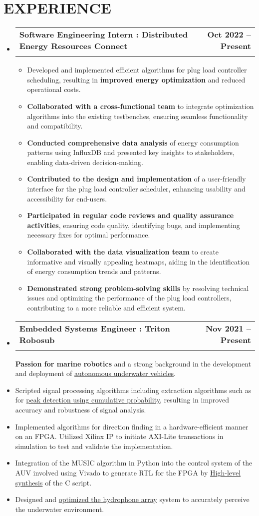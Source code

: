 \documentclass[letterpaper,11pt]{article}
\makeatletter
\newcommand{\resumeItem}[1]{
  \item\small{
    {#1 \vspace{-2pt}}
  }
}
\newcommand{\resumeSubheading}[4]{
  \vspace{-2pt}\item
    \begin{tabular*}{1.0\textwidth}[t]{l@{\extracolsep{\fill}}r}
      \textbf{\large#1} & \textbf{\small #2} \\
      \textit{\large#3} & \textit{\small #4} \\
      
    \end{tabular*}\vspace{-7pt}
}
\newcommand{\resumeSubHeadingListStart}{\begin{itemize}[leftmargin=0.0in, label={}]}
\newcommand{\resumeItemListStart}{\begin{itemize}}
\newcommand{\resumeItemListEnd}{\end{itemize}\vspace{-5pt}}
\makeatother
\begin{document}
\section{EXPERIENCE}
\vspace{5pt}
\resumeSubHeadingListStart
  \resumeSubheading
    {Software Engineering Intern : Distributed Energy Resources Connect}{Oct 2022 -- Present}
    {\underline{}}{\vspace{-15pt}}
    \resumeItemListStart
      \resumeItem{Developed and implemented efficient algorithms for plug load controller scheduling, resulting in
      \textbf{improved energy optimization} and reduced operational costs.}
      \resumeItem{\textbf{Collaborated with a cross-functional team} to integrate optimization algorithms into the existing testbenches, ensuring seamless functionality and compatibility.}
      \resumeItem{\textbf{Conducted comprehensive data analysis} of energy consumption patterns using InfluxDB and presented key insights to stakeholders, enabling data-driven decision-making.}
      \resumeItem{\textbf{Contributed to the design and implementation} of a user-friendly interface for the plug load controller scheduler, enhancing usability and accessibility for end-users.}
      \resumeItem{\textbf{Participated in regular code reviews and quality assurance activities}, ensuring code quality, identifying bugs, and implementing necessary fixes for optimal performance.}
      \resumeItem{\textbf{Collaborated with the data visualization team} to create informative and visually appealing heatmaps, aiding in the identification of energy consumption trends and patterns.}
      \resumeItem{\textbf{Demonstrated strong problem-solving skills} by resolving technical issues and optimizing the performance of the plug load controllers, contributing to a more reliable and efficient system.}
    \resumeItemListEnd
  \vspace{-7pt}

  \resumeSubheading{Embedded Systems Engineer : Triton Robosub}{Nov 2021 -- Present}
    \resumeItemListStart
      \resumeItem{\textbf{Passion for marine robotics} and a strong background in the development and deployment of \underline{autonomous underwater vehicles}.}
      \resumeItem{Scripted signal processing algorithms including extraction algorithms such as for \underline{peak detection using cumulative probability}, resulting in improved accuracy and robustness of signal analysis.}
      \resumeItem{Implemented algorithms for direction finding in a hardware-efficient manner on an FPGA. Utilized Xilinx IP to initiate AXI-Lite transactions in simulation to test and validate the implementation.}
      \resumeItem{Integration of the MUSIC algorithm in Python into the control system of the AUV involved using Vivado to generate RTL for the FPGA by \underline{High-level synthesis} of the C script.}
      \resumeItem{Designed and \underline{optimized the hydrophone array} system to accurately perceive the underwater environment.}
    \resumeItemListEnd
\end{document}
